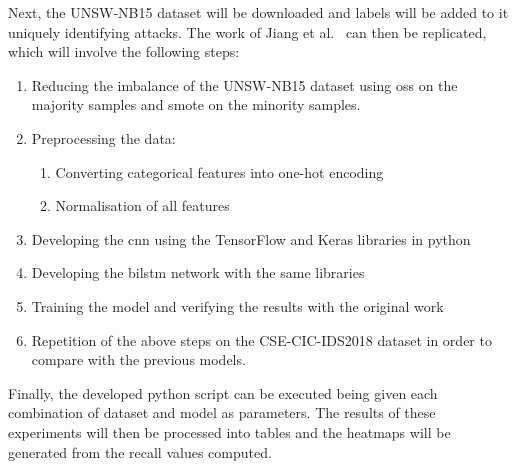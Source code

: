 Next, the UNSW-NB15 dataset will be downloaded and labels will be added to it
uniquely identifying attacks. The work of Jiang et al.~\cite{Jiang} can then be replicated,
which will involve the following steps:
\begin{enumerate}
      \item Reducing the imbalance of the UNSW-NB15 dataset using \gls{oss} on the majority
            samples and \gls{smote} on the minority samples.
      \item Preprocessing the data:
            \begin{enumerate}
                  \item Converting categorical features into one-hot encoding
                  \item Normalisation of all features
            \end{enumerate}
      \item Developing the \gls{cnn} using the TensorFlow and Keras libraries in python
      \item Developing the \gls{bilstm} network with the same libraries
      \item Training the model and verifying the results with the original work
      \item Repetition of the above steps on the CSE-CIC-IDS2018 dataset in order to compare
            with the previous models.
\end{enumerate}

Finally, the developed python script can be executed being given each
combination of dataset and model as parameters. The results of these
experiments will then be processed into tables and the heatmaps will be
generated from the recall values computed.
